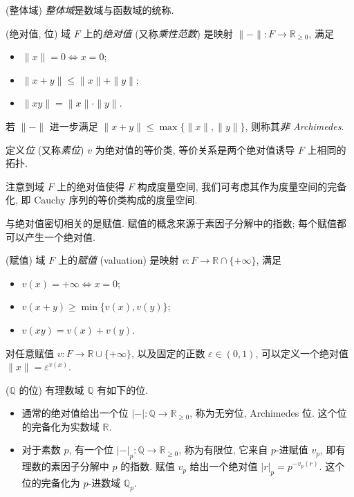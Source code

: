 \documentclass{book}
\begin{document}
	
	\begin{definition}
		{(整体域)}
		\emph{整体域}是数域与函数域的统称.
	\end{definition}
	
	\begin{definition}
		{(绝对值, 位)}
		域 $F$ 上的\emph{绝对值} (又称\emph{乘性范数}) 是映射 $\|{-}\|\colon F \to \mathbb R_{\geq 0}$, 满足
		\begin{itemize}
			\item $\|x\|=0\Leftrightarrow x=0$;
			\item $\|x+y\|\leq \|x\|+\|y\|$;
			\item $\|xy\|=\|x\|\cdot\|y\|$.
		\end{itemize}
		若 $\|{-}\|$ 进一步满足 $\|x+y\|\leq \max \{ \|x\|,\|y\|\}$, 则称其\emph{非 Archimedes}.
		
		定义\emph{位} (又称\emph{素位}) $v$ 为绝对值的等价类, 等价关系是两个绝对值诱导 $F$ 上相同的拓扑.
	\end{definition}
	
	注意到域 $F$ 上的绝对值使得 $F$ 构成度量空间, 我们可考虑其作为度量空间的完备化, 即 Cauchy 序列的等价类构成的度量空间.
	
	与绝对值密切相关的是赋值. 赋值的概念来源于素因子分解中的指数; 每个赋值都可以产生一个绝对值.
	
	\begin{definition}
		{(赋值)}
		域 $F$ 上的\emph{赋值} (valuation) 是映射 $v\colon F \to \mathbb R\cap \{+\infty\}$, 满足
		\begin{itemize}
			\item $v(x)=+\infty \Leftrightarrow x=0$;
			\item $v(x+y)\geq\min \{v(x),v(y)\}$;
			\item $v(xy) = v(x) + v(y)$.
		\end{itemize}
	\end{definition}
	
	对任意赋值 $v\colon F\to \mathbb R \cup \{+\infty\}$,
	以及固定的正数 $\varepsilon\in (0,1)$,
	可以定义一个绝对值 $\|x\| = \varepsilon^{v(x)}$.
	
	\begin{example}
		{($\mathbb Q$ 的位)}
		有理数域 $\mathbb Q$ 有如下的位.
		\begin{itemize}
			\item 通常的绝对值给出一个位 $|{-}|\colon \mathbb{Q}\to\mathbb{R}_{\geq 0}$, 称为无穷位, Archimedes 位. 这个位的完备化为实数域 $\mathbb{R}$.
			\item 对于素数 $p$, 有一个位 $|{-}|_p\colon \mathbb{Q}\to \mathbb{R}_{\geq 0}$, 称为有限位, 它来自 $p$-进赋值 $v_p$, 即有理数的素因子分解中 $p$ 的指数. 赋值 $v_p$ 给出一个绝对值 $|r|_p=p^{-v_p(r)}$. 这个位的完备化为 $p$-进数域 $\mathbb{Q}_p$.
		\end{itemize}
	\end{example}
	
\end{document}

